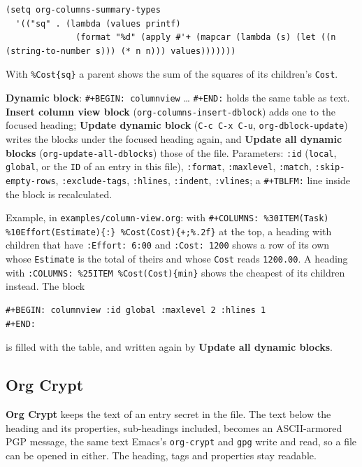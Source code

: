 \documentclass[11pt]{article}
\begin{document}
\begin{verbatim}
(setq org-columns-summary-types
  '(("sq" . (lambda (values printf)
              (format "%d" (apply #'+ (mapcar (lambda (s) (let ((n (string-to-number s))) (* n n))) values)))))))
\end{verbatim}

With \texttt{\%Cost\{sq\}} a parent shows the sum of the squares of its children's \texttt{Cost}.

\textbf{Dynamic block}: \texttt{\#+BEGIN: columnview} \ldots{} \texttt{\#+END:} holds the same table as text. \textbf{Insert column view block} (\texttt{org-columns-insert-dblock}) adds one to the focused heading; \textbf{Update dynamic block} (\texttt{C-c C-x C-u}, \texttt{org-dblock-update}) writes the blocks under the focused heading again, and \textbf{Update all dynamic blocks} (\texttt{org-update-all-dblocks}) those of the file. Parameters: \texttt{:id} (\texttt{local}, \texttt{global}, or the \texttt{ID} of an entry in this file), \texttt{:format}, \texttt{:maxlevel}, \texttt{:match}, \texttt{:skip-empty-rows}, \texttt{:exclude-tags}, \texttt{:hlines}, \texttt{:indent}, \texttt{:vlines}; a \texttt{\#+TBLFM:} line inside the block is recalculated.

Example, in \texttt{examples/column-view.org}: with \texttt{\#+COLUMNS: \%30ITEM(Task) \%10Effort(Estimate)\{:\} \%Cost(Cost)\{+;\%.2f\}} at the top, a heading with children that have \texttt{:Effort: 6:00} and \texttt{:Cost: 1200} shows a row of its own whose \texttt{Estimate} is the total of theirs and whose \texttt{Cost} reads \texttt{1200.00}. A heading with \texttt{:COLUMNS: \%25ITEM \%Cost(Cost)\{min\}} shows the cheapest of its children instead. The block

\begin{verbatim}
#+BEGIN: columnview :id global :maxlevel 2 :hlines 1
#+END:
\end{verbatim}

is filled with the table, and written again by \textbf{Update all dynamic blocks}.

\subsection{Org Crypt}
\label{sec:orgf01cffd}
\textbf{Org Crypt} keeps the text of an entry secret in the file. The text below the heading and its properties, sub-headings included, becomes an ASCII-armored PGP message, the same text Emacs's \texttt{org-crypt} and \texttt{gpg} write and read, so a file can be opened in either. The heading, tags and properties stay readable.
\end{document}
